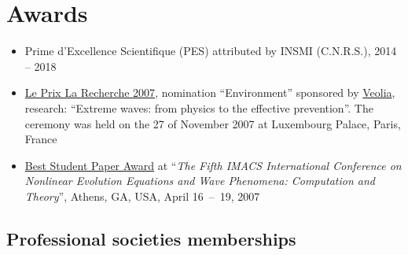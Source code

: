 \documentclass[final, a4paper, oneside, 12pt]{article}
\numberwithin{equation}{section}
\begin{document}

\newpage
\section{Awards}

\begin{itemize}

  \item Prime d'Excellence Scientifique (PES) attributed by INSMI (C.N.R.S.), 2014 -- 2018
  
  \item \href{https://www.actu-environnement.com/ae/news/laureats_prix_la_recherche_2007_mention_environnement_veolia_environnement_3807.php4}{Le Prix La Recherche 2007}, nomination ``Environment'' sponsored by \href{http://www.veolia.fr/}{Veolia}, research: ``Extreme waves: from physics to the effective prevention''. The ceremony was held on the 27 of November 2007 at Luxembourg Palace, Paris, France
  
  \item \href{https://cobweb.cs.uga.edu/~thiab/waves2007.html}{Best Student Paper Award} at ``\textit{The Fifth IMACS International Conference on Nonlinear Evolution Equations and Wave Phenomena: Computation and Theory}'', Athens, GA, USA, April 16~--~19, 2007
  
\end{itemize}


\subsection{Professional societies memberships}
\end{document}
